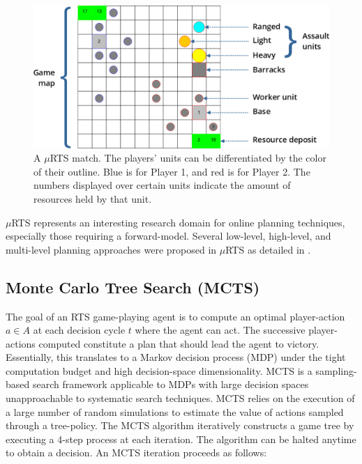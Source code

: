 \documentclass[conference]{IEEEtran}
\newcommand{\mRTS}{$\mu$RTS}
\begin{document}

\begin{figure}[t]
\begin{center}
	\includegraphics[scale=1]{figs/mRTS.png}
	\caption{A \mRTS{} match. The players' units can be differentiated by the color of their outline. Blue is for Player 1, and red is for Player 2. The numbers displayed over certain units indicate the amount of resources held by that unit. }
	\label{mRTSScreenshot}
\end{center}
\end{figure}

\mRTS{} represents an interesting research domain for online planning techniques, especially those requiring a forward-model. Several low-level, high-level, and multi-level planning approaches were proposed in \mRTS{} as detailed in \cite{ouessai_online_2019}.


\subsection{Monte Carlo Tree Search (MCTS)}

The goal of an RTS game-playing agent is to compute an optimal player-action $a \in A$ at each decision cycle $t$ where the agent can act. The successive player-actions computed constitute a plan that should lead the agent to victory. Essentially, this translates to a Markov decision process (MDP) under the tight computation budget and high decision-space dimensionality. MCTS is a sampling-based search framework applicable to MDPs with large decision spaces unapproachable to systematic search techniques. MCTS relies on the execution of a large number of random simulations to estimate the value of actions sampled through a tree-policy. The MCTS algorithm iteratively constructs a game tree by executing a 4-step process at each iteration. The algorithm can be halted anytime to obtain a decision. An MCTS iteration proceeds as follows:
\end{document}
